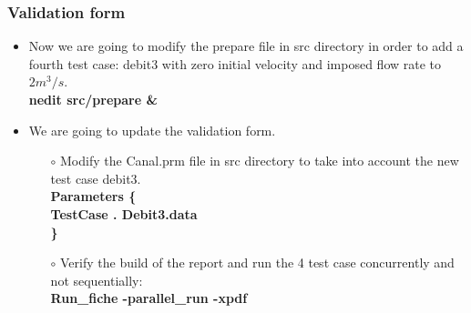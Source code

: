 \documentclass[10pt]{beamer}
\begin{document}
\begin{frame}
\frametitle{Validation form}
\begin{block}{}

\begin{itemize}
\item Now we are going to modify the prepare file in src directory in order to add a fourth test case: debit3 with zero initial velocity and imposed flow rate to $2 m^3/s$.\\
\textbf{nedit src/prepare \& }

\item We are going to update the validation form.
    \begin{itemize}
    \item [$\circ$] Modify the Canal.prm file in src directory to take into account the new test case debit3.\\
    \textbf{Parameters \{} \\
    \hspace{0.3cm} \textbf{TestCase . Debit3.data}\\
    \textbf{\}}
    \item [$\circ$] Verify the build of the report and run the 4 test case concurrently and not sequentially:\\
    \textbf{Run\_fiche -parallel\_run -xpdf}
    \end{itemize}

\end{itemize}

\end{block}
\end{frame}






\end{document}
